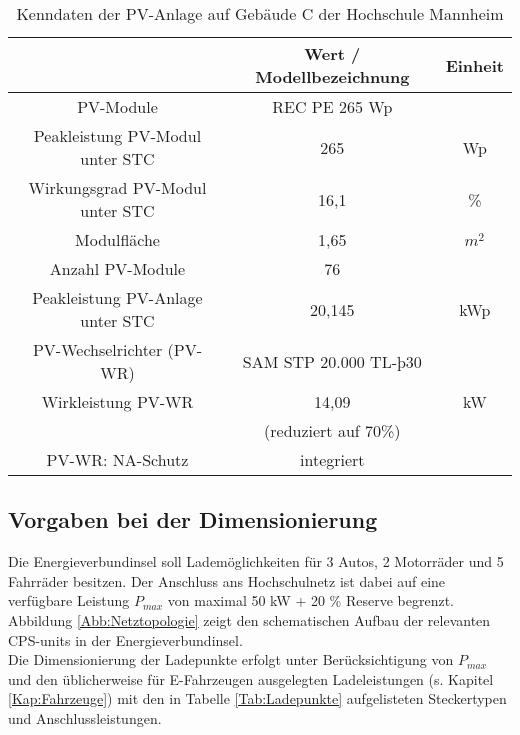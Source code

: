 		\begin{table}[h]
			\begin{tabular}{|c|c|c|}
				\hline 
				 							& \textbf{Wert / Modellbezeichnung} & \textbf{Einheit} \\ 
				\hline 
				PV-Module 							& REC PE 265 Wp &   \\ 
				\hline 
				Peakleistung PV-Modul unter STC 	& 265 		& Wp \\ 
				\hline
				Wirkungsgrad PV-Modul unter STC 	& 16,1 		& \%  \\ 
				\hline 
				Modulfläche 						& 1,65 		& $m^2$  \\ 
				\hline 
				Anzahl PV-Module 					& 76 		& \\ 
				\hline  
				Peakleistung PV-Anlage unter STC	& 20,145 	& kWp  \\ 
				\hline 
				PV-Wechselrichter (PV-WR) 			& SAM STP 20.000 TL-þ30 & \\ 
				\hline
				Wirkleistung PV-WR 					& 14,09 	& kW\\
                									& (reduziert auf 70\%)   &\\ 
				\hline
				PV-WR: NA-Schutz 					& integriert &\\ 
				\hline
			\end{tabular} 
			\caption{Kenndaten der PV-Anlage auf Gebäude C der Hochschule Mannheim} %
			\label{Tab:PV_kenndaten}
		\end{table}
		
		

		


		
	\subsection{Vorgaben bei der Dimensionierung}
		\label{Kap:Vorgaben}
		
		Die Energieverbundinsel soll Lademöglichkeiten für 3 Autos, 2 Motorräder und 5 Fahrräder besitzen. Der Anschluss ans Hochschulnetz ist dabei auf eine verfügbare Leistung $P_{max}$ von maximal 50 kW + 20 \% Reserve begrenzt. Abbildung \ref{Abb:Netztopologie} zeigt den schematischen Aufbau der relevanten CPS-units in der Energieverbundinsel.\\

		Die Dimensionierung der Ladepunkte erfolgt unter Berücksichtigung von $P_{max}$ und den üblicherweise für E-Fahrzeugen ausgelegten Ladeleistungen (s. Kapitel \ref{Kap:Fahrzeuge}) mit den in Tabelle \ref{Tab:Ladepunkte} aufgelisteten Steckertypen und Anschlussleistungen. \\
        
